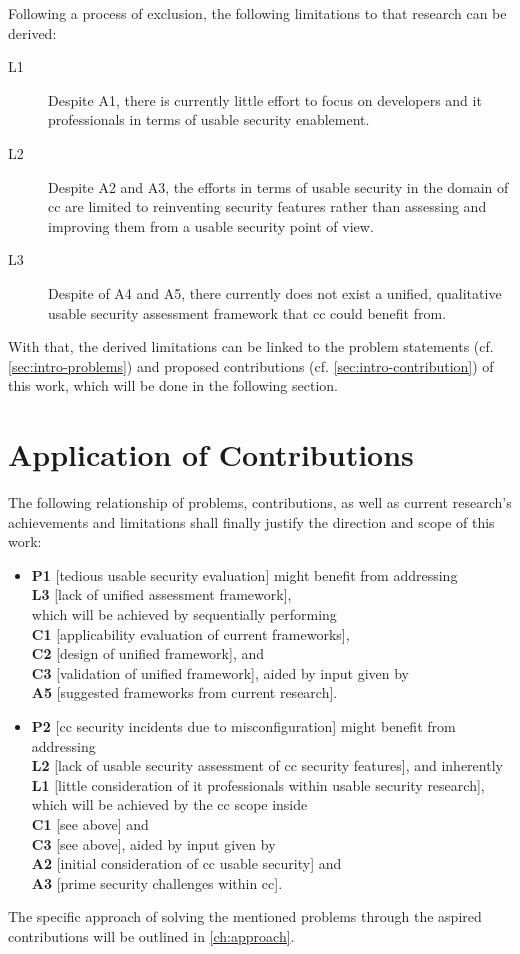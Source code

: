 Following a process of exclusion, the following limitations to that research can be derived:

\begin{description}
	\item[L1] Despite A1, there is currently little effort to focus on developers and \ac{it} professionals in terms of usable security enablement.
	\item[L2] Despite A2 and A3, the efforts in terms of usable security in the domain of \ac{cc} are limited to reinventing security features rather than assessing and improving them from a usable security point of view.
	\item[L3] Despite of A4 and A5, there currently does not exist a unified, qualitative usable security assessment framework that \ac{cc} could benefit from.
\end{description}

With that, the derived limitations can be linked to the problem statements (cf. \autoref{sec:intro-problems}) and proposed contributions (cf. \autoref{sec:intro-contribution}) of this work, which will be done in the following section.

\section{Application of Contributions}
The following relationship of problems, contributions, as well as current research's achievements and limitations shall finally justify the direction and scope of this work:

\begin{itemize}
	\item \textbf{P1} [tedious usable security evaluation] might benefit from addressing\\ \textbf{L3} [lack of unified assessment framework],\\ which will be achieved by sequentially performing\\ \textbf{C1} [applicability evaluation of current frameworks],\\ \textbf{C2} [design of unified framework], and\\\textbf{C3} [validation of unified framework], aided by input given by\\ \textbf{A5} [suggested frameworks from current research].
	\item \textbf{P2} [\ac{cc} security incidents due to misconfiguration] might benefit from addressing\\ \textbf{L2} [lack of usable security assessment of \ac{cc} security features], and inherently\\ \textbf{L1} [little consideration of \ac{it} professionals within usable security research],\\ which will be achieved by the \ac{cc} scope inside\\ \textbf{C1} [see above] and\\ \textbf{C3} [see above], aided by input given by \\\textbf{A2} [initial consideration of \ac{cc} usable security]  and \\\textbf{A3} [prime security challenges within \ac{cc}]. 
\end{itemize}

The specific approach of solving the mentioned problems through the aspired contributions will be outlined in \autoref{ch:approach}.

